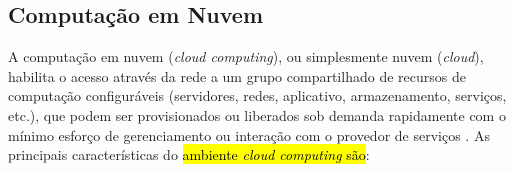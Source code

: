 



\subsection{Computação em Nuvem}

A computação em nuvem (\emph{cloud computing}), ou simplesmente nuvem
(\emph{cloud}), habilita o acesso através da rede a um grupo compartilhado de
recursos de computação configuráveis (servidores, redes, aplicativo,
armazenamento, serviços, etc.), que podem ser provisionados ou liberados sob
demanda rapidamente com o mínimo esforço de gerenciamento ou interação com o
provedor de serviços \cite{NIST2011}. As principais características do
\hl{ambiente \emph{cloud computing} são}:


